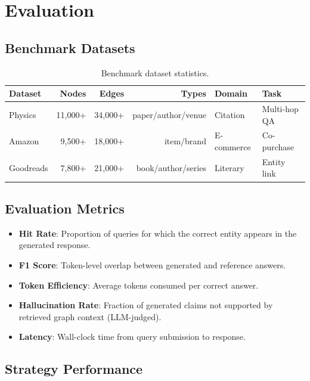 \documentclass[12pt,a4paper]{article}
\begin{document}
\section{Evaluation}

\subsection{Benchmark Datasets}

\begin{table}[htbp]
\centering
\caption{Benchmark dataset statistics.}
\label{tab:datasets}
\begin{tabular}{lrrrll}
\toprule
\textbf{Dataset} & \textbf{Nodes} & \textbf{Edges} & \textbf{Types} & \textbf{Domain} & \textbf{Task} \\
\midrule
Physics  & 11,000+ & 34,000+ & paper/author/venue & Citation & Multi-hop QA \\
Amazon   & 9,500+  & 18,000+ & item/brand & E-commerce & Co-purchase \\
Goodreads & 7,800+ & 21,000+ & book/author/series & Literary & Entity link \\
\bottomrule
\end{tabular}
\end{table}

\subsection{Evaluation Metrics}

\begin{itemize}
  \item \textbf{Hit Rate}: Proportion of queries for which the correct
    entity appears in the generated response.
  \item \textbf{F1 Score}: Token-level overlap between generated and
    reference answers.
  \item \textbf{Token Efficiency}: Average tokens consumed per correct answer.
  \item \textbf{Hallucination Rate}: Fraction of generated claims not
    supported by retrieved graph context (LLM-judged).
  \item \textbf{Latency}: Wall-clock time from query submission to response.
\end{itemize}

\subsection{Strategy Performance}
\end{document}
